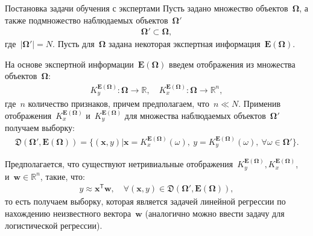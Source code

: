 \documentclass[9pt,pdf,hyperref={unicode}]{beamer}
\begin{document}

\begin{frame}{Постановка задачи обучения с экспертами}
\justifying
Пусть задано множество объектов~$\bm{\Omega}$, а также подмножество наблюдаемых объектов~$\bm{\Omega}'$
\begin{equation*}
\begin{aligned}
\bm{\Omega}'\subset\bm{\Omega},
\end{aligned}
\end{equation*}
где~$\left|\bm{\Omega}'\right|=N$.
Пусть для~$\bm{\Omega}$ задана некоторая экспертная информация~$\bm{E}\left(\bm{\Omega}\right)$.

На основе экспертной информации~$\bm{E}\left(\bm{\Omega}\right)$ введем отображения из множества объектов~$\bm{\Omega}$:
\begin{equation*}
\begin{aligned}
K_y^{\bm{E}\left(\bm{\Omega}\right)} :\bm{\Omega}\to \mathbb{R}, \quad K_x^{\bm{E}\left(\bm{\Omega}\right)} :\bm{\Omega}\to \mathbb{R}^{n},
\end{aligned}
\end{equation*}
где~$n$ количество признаков, причем предполагаем, что~$n\ll N$. Применив отображения~$K_x^{\bm{E}\left(\bm{\Omega}\right)}$ и~$K_y^{\bm{E}\left(\bm{\Omega}\right)}$ для множества наблюдаемых объектов~$\bm{\Omega}'$ получаем выборку:
\begin{equation*}
\begin{aligned}
\mathfrak{D}\left(\bm{\Omega}',\bm{E}\left(\bm{\Omega}\right)\right) = \{\left(\textbf{x}, y\right)|\textbf{x}=K_x^{\bm{E}\left(\bm{\Omega}\right)}\left(\omega\right),~y=K_y^{\bm{E}\left(\bm{\Omega}\right)}\left(\omega\right),~\forall \omega \in \bm{\Omega}'\}.
\end{aligned}
\end{equation*}

Предполагается, что существуют нетривиальные отображения~$K_y^{\bm{E}\left(\bm{\Omega}\right)}, K_x^{\bm{E}\left(\bm{\Omega}\right)}$, и~$\textbf{w}\in\mathbb{R}^{n}$, такие, что:
\begin{equation*}
\begin{aligned}
y \approx \textbf{x}^{\mathsf{T}}\textbf{w}, \quad \forall\left(\textbf{x}, y\right)\in\mathfrak{D}\left(\bm{\Omega}',\bm{E}\left(\bm{\Omega}\right)\right),
\end{aligned}
\end{equation*}
то есть получаем выборку, которая является задачей линейной регрессии по нахождению неизвестного вектора~$\textbf{w}$ (аналогично можно ввести задачу для логистической регрессии).

\end{frame}
\end{document}
